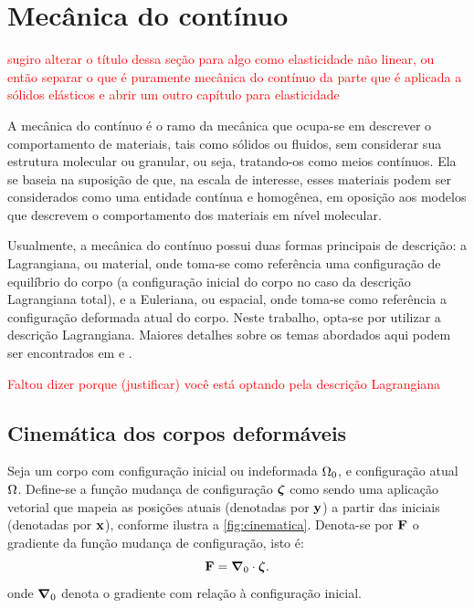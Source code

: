 \documentclass[Tese.tex]{subfiles}
\begin{document}
	
\chapter{Mecânica do contínuo}\label{ch:mecanica-dos-solidos}

\textcolor{red}{sugiro alterar o título dessa seção para algo como elasticidade não linear, ou então separar o que é puramente mecânica do contínuo da parte que é aplicada a sólidos elásticos e abrir um outro capítulo para elasticidade}

A mecânica do contínuo é o ramo da mecânica que ocupa-se em descrever o comportamento de materiais, tais como sólidos ou fluidos, sem considerar sua estrutura molecular ou granular, ou seja, tratando-os como meios contínuos. Ela se baseia na suposição de que, na escala de interesse, esses materiais podem ser considerados como uma entidade contínua e homogênea, em oposição aos modelos que descrevem o comportamento dos materiais em nível molecular.

Usualmente, a mecânica do contínuo possui duas formas principais de descrição: a Lagrangiana, ou material, onde toma-se como referência uma configuração de equilíbrio do corpo (a configuração inicial do corpo no caso da descrição Lagrangiana total), e a Euleriana, ou espacial, onde toma-se como referência a configuração deformada atual do corpo. Neste trabalho, opta-se por utilizar a descrição Lagrangiana. Maiores detalhes sobre os temas abordados aqui podem ser encontrados em  e .

\textcolor{red}{Faltou dizer porque (justificar) você está optando pela descrição Lagrangiana}

\section{Cinemática dos corpos deformáveis}\label{sec:cinematica}

Seja um corpo com configuração inicial ou indeformada $\Omega_0$, e configuração atual $\Omega$. Define-se a {função mudança de configuração} $\boldsymbol{\zeta}$ como sendo uma aplicação vetorial que mapeia as posições atuais (denotadas por $\mathbf{y}$) a partir das iniciais (denotadas por $\mathbf{x}$), conforme ilustra a \autoref{fig:cinematica}. Denota-se por $\mathbf{F}$ o gradiente da função mudança de configuração, isto é:
\begin{equation}\label{eq:A}
\mathbf{F} = \boldsymbol{\nabla}_0\cdot\boldsymbol{\zeta}.
\end{equation}
onde $\boldsymbol{\nabla}_0$ denota o gradiente com relação à configuração inicial.
\end{document}
